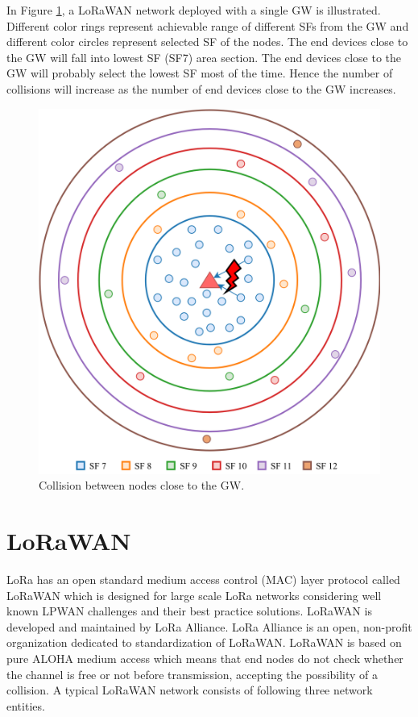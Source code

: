 \documentclass[conference]{IEEEtran}
\begin{document}
\par In Figure \ref{fig:collision}, a LoRaWAN network deployed with a single GW is illustrated. Different color rings represent achievable range of different SFs from the GW and different color circles represent selected SF of the nodes. The end devices close to the GW will fall into lowest SF (SF7) area section. The end devices close to the GW will probably select the lowest SF most of the time. Hence the number of collisions will increase as the number of end devices close to the GW increases.

\begin{figure}
\centering
\includegraphics[width=\linewidth]{collision}
\caption{Collision between nodes close to the GW.}
\label{fig:collision}
\end{figure}


\section{LoRaWAN} \label{LoRaWAN}
\par LoRa has an open standard medium access control (MAC) layer protocol called LoRaWAN which is designed for large scale LoRa networks considering well known LPWAN challenges and their best practice solutions. LoRaWAN is developed and maintained by LoRa Alliance. LoRa Alliance is an open, non-profit organization dedicated to standardization of LoRaWAN. LoRaWAN is based on pure ALOHA medium access which means that end nodes do not check whether the channel is free or not before transmission, accepting the possibility of a collision. A typical LoRaWAN network consists of following three network entities.
\end{document}
